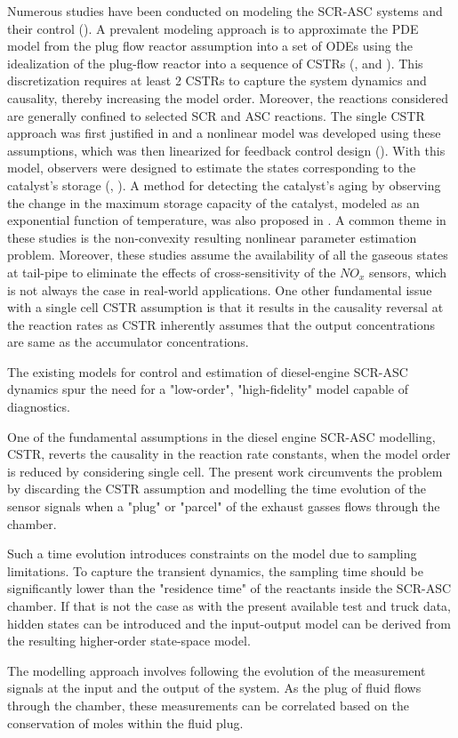 Numerous studies have been conducted on modeling the SCR-ASC systems and their
control (\cite{yuan2015diesel}). A prevalent modeling approach is to
approximate the PDE model from the plug flow reactor assumption into a set of
ODEs using the idealization of the plug-flow reactor into a sequence of CSTRs
(\cite{hsieh2011development}, and \cite{nova2014urea}). This discretization
requires at least 2 CSTRs to capture the system dynamics and causality, thereby
increasing the model order. Moreover, the reactions considered are generally
confined to selected SCR and ASC reactions. The single CSTR approach was first
justified in \cite{devarakonda2008adequacy} and a nonlinear model was developed
using these assumptions, which was then linearized for feedback control design
(\cite{devarakonda2009model}). With this model, observers were designed to
estimate the states corresponding to the catalyst's storage
(\cite{ma2017observer}, \cite{jain2020term}). A method for detecting the
catalyst's aging by observing the change in the maximum storage capacity of the
catalyst, modeled as an exponential function of temperature, was also proposed
in \cite{ma2017observer}. A common theme in these studies is the non-convexity
resulting nonlinear parameter estimation problem. Moreover,
these studies assume the availability of all the gaseous states at tail-pipe to
eliminate the effects of cross-sensitivity of the $NO_x$ sensors, which is not
always the case in real-world applications. One other fundamental issue with a single cell CSTR assumption is that it
results in the causality reversal at the reaction rates as CSTR inherently
assumes that the output concentrations are same as the accumulator concentrations.


The existing models for control and estimation of diesel-engine SCR-ASC dynamics
spur the need for a "low-order", "high-fidelity" model capable of diagnostics.

One of the fundamental assumptions in the diesel engine SCR-ASC modelling, CSTR,
reverts the causality in the reaction rate constants, when the model order is
reduced by considering single cell. The present work circumvents the problem by
discarding the CSTR assumption and modelling the time evolution of the sensor
signals when a "plug" or "parcel" of the exhaust gasses flows through the
chamber.

Such a time evolution introduces constraints on the model due to sampling
limitations. To capture the transient dynamics, the sampling time should be
significantly lower than the "residence time" of the reactants inside the
SCR-ASC chamber. If that is not the case as with the present available test and
truck data, hidden states can be introduced and the input-output model can be
derived from the resulting higher-order state-space model.

The modelling approach involves following the evolution of the measurement
signals at the input and the output of the system. As the plug of fluid flows
through the chamber, these measurements can be correlated based on the
conservation of moles within the fluid plug.
